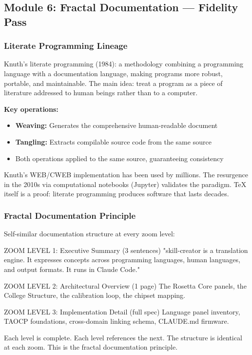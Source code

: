 \documentclass[11pt,letterpaper]{article}
\begin{document}
\subsection{Module 6: Fractal Documentation --- Fidelity Pass}

\subsubsection{Literate Programming Lineage}

Knuth's literate programming (1984): a methodology combining a programming language with a documentation language, making programs more robust, portable, and maintainable. The main idea: treat a program as a piece of literature addressed to human beings rather than to a computer.

\textbf{Key operations:}
\begin{itemize}[leftmargin=1.5em]
  \item \textbf{Weaving:} Generates the comprehensive human-readable document
  \item \textbf{Tangling:} Extracts compilable source code from the same source
  \item Both operations applied to the same source, guaranteeing consistency
\end{itemize}

Knuth's WEB/CWEB implementation has been used by millions. The resurgence in the 2010s via computational notebooks (Jupyter) validates the paradigm. TeX itself is a proof: literate programming produces software that lasts decades.

\subsubsection{Fractal Documentation Principle}

Self-similar documentation structure at every zoom level:

\begin{asciibox}
ZOOM LEVEL 1: Executive Summary (3 sentences)
  "skill-creator is a translation engine. It expresses
   concepts across programming languages, human languages,
   and output formats. It runs in Claude Code."

ZOOM LEVEL 2: Architectural Overview (1 page)
  The Rosetta Core panels, the College Structure,
  the calibration loop, the chipset mapping.

ZOOM LEVEL 3: Implementation Detail (full spec)
  Language panel inventory, TAOCP foundations,
  cross-domain linking schema, CLAUDE.md firmware.

Each level is complete. Each level references the next.
The structure is identical at each zoom. This is the
fractal documentation principle.
\end{asciibox}
\end{document}
